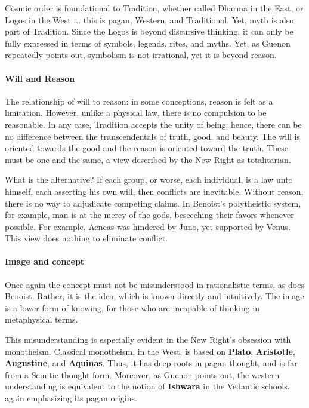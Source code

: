 Cosmic order is foundational to Tradition, whether called Dharma in the East, or Logos in the West ... this is pagan, Western, and Traditional. Yet, myth is also part of Tradition. Since the Logos is beyond discursive thinking, it can only be fully expressed in terms of symbols, legends, rites, and myths. Yet, as Guenon repeatedly points out, symbolism is not irrational, yet it is beyond reason.

\paragraph{Will and Reason}


The relationship of will to reason: in some conceptions, reason is felt as a limitation. However, unlike a physical law, there is no compulsion to be reasonable. In any case, Tradition accepts the unity of being; hence, there can be no difference between the transcendentals of truth, good, and beauty. The will is oriented towards the good and the reason is oriented toward the truth. These must be one and the same, a view described by the New Right as totalitarian.

What is the alternative? If each group, or worse, each individual, is a law unto himself, each asserting his own will, then conflicts are inevitable. Without reason, there is no way to adjudicate competing claims. In Benoist's polytheistic system, for example, man is at the mercy of the gods, beseeching their favors whenever possible. For example, Aeneas was hindered by Juno, yet supported by Venus. This view does nothing to eliminate conflict.

\paragraph{Image and concept}


Once again the concept must not be misunderstood in rationalistic terms, as does Benoist. Rather, it is the idea, which is known directly and intuitively. The image is a lower form of knowing, for those who are incapable of thinking in metaphysical terms.

This misunderstanding is especially evident in the New Right's obsession with monotheism. Classical monotheism, in the West, is based on \textbf{Plato}, \textbf{Aristotle}, \textbf{Augustine}, and \textbf{Aquinas}. Thus, it has deep roots in pagan thought, and is far from a Semitic thought form. Moreover, as Guenon points out, the western understanding is equivalent to the notion of \textbf{Ishwara} in the Vedantic schools, again emphasizing its pagan origins.

